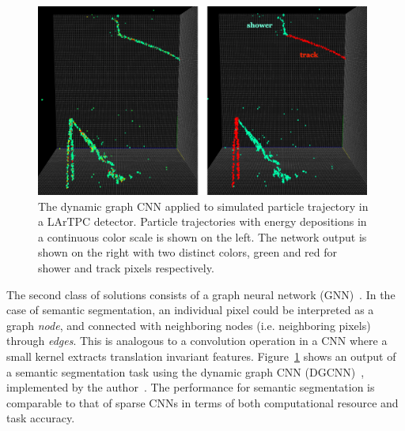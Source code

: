\documentclass{ws-rv9x6}
\begin{document}
\begin{figure}[t]
    \centering
    \includegraphics[width=0.98\textwidth]{figures/dgcnn.pdf}
    \caption{The dynamic graph CNN applied to simulated particle trajectory in a LArTPC detector. Particle trajectories with energy depositions in a continuous color scale is shown on the left. The network output is shown on the right with two distinct colors, green and red for shower and track pixels respectively.}
    \label{fig:clustering:dgcnn}
\end{figure}
The second class of solutions consists of a graph neural network (GNN)~\cite{zhou2018graph}. In the case of semantic segmentation, an individual pixel could be interpreted as a graph {\it node}, and connected with neighboring nodes (i.e. neighboring pixels) through {\it edges}. This is analogous to a convolution operation in a CNN where a small kernel extracts translation invariant features.  Figure~\ref{fig:clustering:dgcnn} shows an output of a semantic segmentation task using the dynamic graph CNN (DGCNN)~\cite{Manessi_2020}, implemented by the author~\cite{drinkingkazu_dgcnn}.
The performance for semantic segmentation is comparable to that of sparse CNNs in terms of both computational resource and task accuracy.
\end{document}
